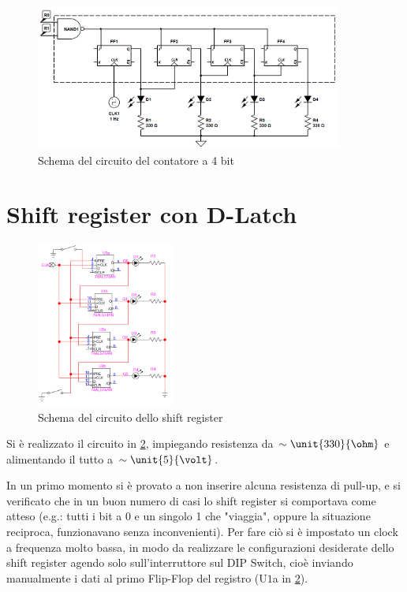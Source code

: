 \documentclass[a4paper,10pt]{article}
\begin{document}
\begin{figure}[H]
	\centering
	\includegraphics[width=0.9\textwidth]{../grafici/counterScheme.png}
	\caption{Schema del circuito del contatore a 4 bit}
	\label{fig:counter}
\end{figure}

\pagebreak

\section{Shift register con D-Latch}

\begin{figure}
	\vspace{-20pt}
	\centering
	\includegraphics[width=0.4\textwidth]{../grafici/shiftreg.png}
	\vspace{-10pt}
	\caption{Schema del circuito dello shift register}
	\label{fig:shift}
	\vspace{-40pt}
\end{figure}

Si è realizzato il circuito in \cref{fig:shift}, impiegando resistenza da $\sim \unit{330}{\ohm}$ e alimentando il tutto a $\sim \unit{5}{\volt}$.

In un primo momento si è provato a non inserire alcuna resistenza di pull-up, e si verificato che in un buon numero di casi lo shift register si comportava come atteso (e.g.: tutti i bit a 0 e un singolo 1 che "viaggia", oppure la situazione reciproca, funzionavano senza inconvenienti). 
Per fare ciò si è impostato un clock a frequenza molto bassa, in modo da realizzare le configurazioni desiderate dello shift register agendo solo sull'interruttore sul DIP Switch, cioè inviando manualmente i dati al primo Flip-Flop del registro (U$1$a in \cref{fig:shift}).
\end{document}
